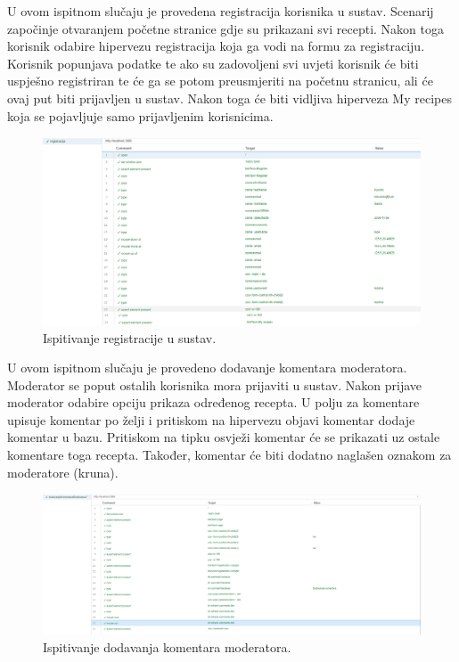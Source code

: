 \newpage

\noindent {}\break
U ovom ispitnom slučaju je provedena registracija korisnika u sustav. Scenarij započinje otvaranjem početne
stranice gdje su prikazani svi recepti. Nakon toga korisnik odabire hipervezu registracija koja
ga vodi na formu za registraciju. Korisnik popunjava podatke te ako su zadovoljeni svi uvjeti
korisnik će biti uspješno registriran te će ga se potom preusmjeriti na početnu stranicu,
ali će ovaj put biti prijavljen u sustav. Nakon toga će biti vidljiva hiperveza My recipes
koja se pojavljuje samo prijavljenim korisnicima.
\begin{figure}[H]
	\includegraphics[scale=0.2]{slike/registracija1.png} %
	\centering
	\caption{Ispitivanje registracije u sustav.}
	\label{fig:promjene}
\end{figure}

\noindent {}\break
U ovom ispitnom slučaju je provedeno dodavanje komentara moderatora. Moderator se poput ostalih
korisnika mora prijaviti u sustav. Nakon prijave moderator odabire opciju prikaza određenog
recepta. U polju za komentare upisuje komentar po želji i pritiskom na hipervezu objavi
komentar dodaje komentar u bazu. Pritiskom na tipku osvježi komentar će se prikazati uz
ostale komentare toga recepta. Također, komentar će biti dodatno naglašen oznakom za moderatore (kruna).
\begin{figure}[H]
	\includegraphics[scale=0.4]{slike/dodavanjeKomentaraModeratora.png.jpg} %
	\centering
	\caption{Ispitivanje dodavanja komentara moderatora.}
	\label{fig:promjene}
\end{figure}

